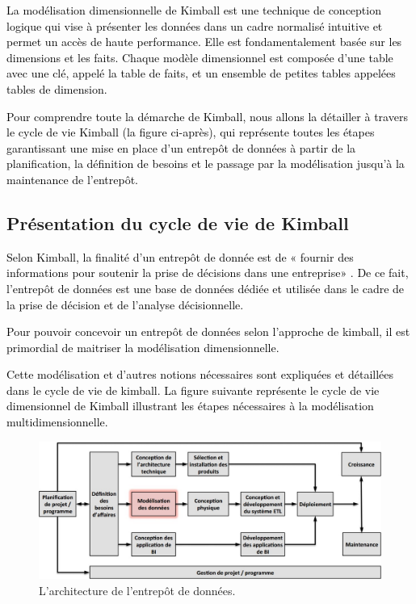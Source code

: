 \documentclass[a4paper,12pt]{report}
\begin{document}
\textcolor{black}{La modélisation dimensionnelle de Kimball est une technique de conception logique qui vise à présenter les données dans un cadre normalisé intuitive et permet un accès de haute performance. Elle est fondamentalement basée sur les dimensions et les faits. Chaque modèle dimensionnel est composée d'une table avec une clé, appelé la table de faits, et un ensemble de petites tables appelées tables de dimension. }

\textcolor{black}{Pour comprendre toute la démarche de Kimball, nous allons la détailler à travers  le cycle de vie  Kimball (la figure ci-après), qui représente toutes les étapes garantissant une mise en place d’un entrepôt de données à partir de la planification, la définition de besoins et le passage par la modélisation jusqu’à la maintenance de l’entrepôt.  }

\subsection{Présentation du cycle de vie de Kimball}

\textcolor{black}{Selon Kimball, la finalité d’un entrepôt de donnée est de « fournir des informations pour soutenir la prise de décisions dans une entreprise» \citep{kimball2013data}. De ce fait, l’entrepôt de données est une base de données dédiée et utilisée dans le cadre de la prise de décision et de l'analyse décisionnelle. }

\textcolor{black}{Pour pouvoir concevoir un entrepôt de données selon l’approche de kimball, il est primordial de maitriser la modélisation dimensionnelle. }

\textcolor{black}{
Cette modélisation et d’autres notions nécessaires sont expliquées et détaillées dans le cycle de vie de kimball. 
La figure suivante représente le cycle de vie dimensionnel de Kimball illustrant les étapes nécessaires à la modélisation multidimensionnelle.}

\begin{figure}[H]
\begin{center}
\includegraphics[width=0.9\linewidth]{./images/11}
\end{center}

\caption{L'architecture de l'entrepôt de données.\citep{kimball2013data}}
\label{fig:11}

\end{figure}
\end{document}
